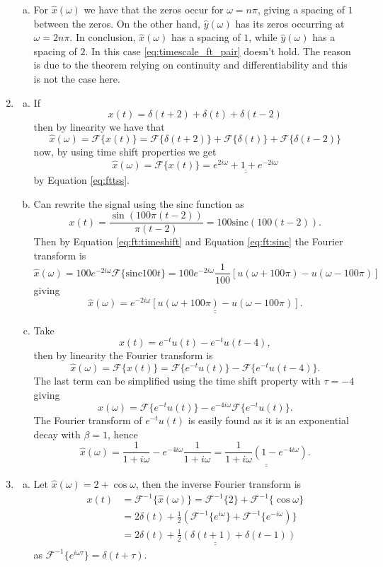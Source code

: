 \begin{enumerate}
\begin{enumerate}[a)]
\item For $\hat{x}(\omega)$ we have that the zeros occur for $\omega=n\pi$, giving a spacing of $1$ between the zeros. On the other hand, $\hat{y}(\omega)$ has its zeros occurring at $\omega=2n\pi$. In conclusion, $\hat{x}(\omega)$ has a spacing of $1$, while $\hat{y}(\omega)$ has a spacing of $2$. In this case \ref{eq:timescale_ft_pair} doesn't hold. The reason is due to the theorem relying on continuity and differentiability and this is not the case here. 
\end{enumerate}
\item
\begin{enumerate}[a)]
\item If 
$$x(t)=\delta(t+2)+\delta(t)+\delta(t-2)$$
then by linearity we have that
$$\hat{x}(\omega)=\mathcal{F}\{x(t)\}=\mathcal{F}\{\delta(t+2)\}+\mathcal{F}\{\delta(t)\}+\mathcal{F}\{\delta(t-2)\}$$
now, by using time shift properties we get
$$\hat{x}(\omega)=\mathcal{F}\{x(t)\}=\underline{\underline{e^{2i\omega}+1+e^{-2i\omega}}}$$
by Equation \ref{eq:fttss}.

\item Can rewrite the signal using the sinc function as
$$x(t)=\frac{\sin(100\pi(t-2))}{\pi(t-2)}=100\text{sinc}(100(t-2)).$$
Then by Equation \ref{eq:ft:timeshift} and Equation \ref{eq:ft:sinc} the Fourier transform is
$$\hat{x}(\omega)=100e^{-2i\omega}\mathcal{F}\{\text{sinc}100t\}=100e^{-2i\omega} \frac{1}{100}[u(\omega+100\pi)-u(\omega-100\pi)]$$
giving
$$\hat{x}(\omega)=\underline{\underline{e^{-2i\omega}[u(\omega+100\pi)-u(\omega-100\pi)]}}.$$

\item Take
$$x(t)=e^{-t}u(t)-e^{-t}u(t-4),$$
then by linearity the Fourier transform is
$$\hat{x}(\omega)=\mathcal{F}\{x(t)\}=\mathcal{F}\{e^{-t}u(t)\}-\mathcal{F}\{e^{-t}u(t-4)\}.$$
The last term can be simplified using the time shift property with $\tau=-4$ giving
$$\hat{x}(\omega)=\mathcal{F}\{e^{-t}u(t)\}-e^{-4i\omega}\mathcal{F}\{e^{-t}u(t)\}.$$
The Fourier transform of $e^{-t}u(t)$ is easily found as it is an exponential decay with $\beta=1$, hence
$$\hat{x}(\omega)=\frac{1}{1+i\omega}-e^{-4i\omega}\frac{1}{1+i\omega}=\underline{\underline{\frac{1}{1+i\omega}\left(1-e^{-4i\omega}\right)}}.$$
\end{enumerate}


\item
\begin{enumerate}[a)]
\item Let $\hat{x}(\omega)=2+\cos\omega$, then the inverse Fourier transform is
\begin{align*}
    x(t)&=\mathcal{F}^{-1}\{\hat{x}(\omega)\}=\mathcal{F}^{-1}\{2\}+\mathcal{F}^{-1}\{\cos\omega\} \\
    &=2\delta(t)+\frac{1}{2}(\mathcal{F}^{-1}\{e^{i\omega}\}+\mathcal{F}^{-1}\{e^{-i\omega})\} \\ &=\underline{\underline{2\delta(t)+\frac{1}{2}(\delta(t+1)+\delta(t-1))}}
\end{align*}
as $\mathcal{F}^{-1}\{e^{i\omega\tau}\}=\delta(t+\tau)$.


\end{enumerate}
\end{enumerate}
